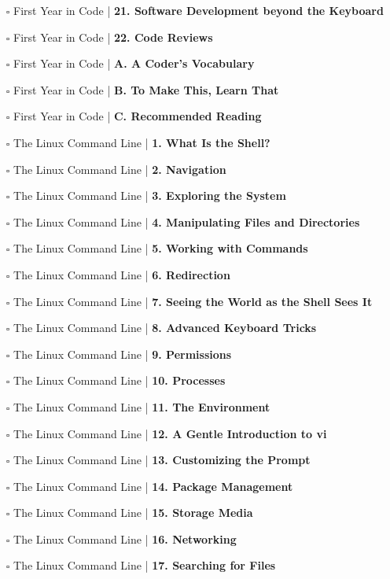 \documentclass[a4, landscape, 12pt]{article}
\newcommand{\checkbox}{$\square$}%
\begin{document}
\begin{itemize}
{}
\item [\checkbox]  First Year in Code | \textbf{ 21. Software Development beyond the Keyboard
}
\item [\checkbox]  First Year in Code | \textbf{ 22. Code Reviews
}
\item [\checkbox]  First Year in Code | \textbf{ A. A Coder's Vocabulary 
}
\item [\checkbox]  First Year in Code | \textbf{ B. To Make This, Learn That
}
\item [\checkbox]  First Year in Code | \textbf{ C. Recommended Reading
}
\item [\checkbox]  The Linux Command Line | \textbf{ 1. What Is the Shell?
}
\item [\checkbox]  The Linux Command Line | \textbf{ 2. Navigation
}
\item [\checkbox]  The Linux Command Line | \textbf{ 3. Exploring the System
}
\item [\checkbox]  The Linux Command Line | \textbf{ 4. Manipulating Files and Directories
}
\item [\checkbox]  The Linux Command Line | \textbf{ 5. Working with Commands
}
\item [\checkbox]  The Linux Command Line | \textbf{ 6. Redirection
}
\item [\checkbox]  The Linux Command Line | \textbf{ 7. Seeing the World as the Shell Sees It
}
\item [\checkbox]  The Linux Command Line | \textbf{ 8. Advanced Keyboard Tricks
}
\item [\checkbox]  The Linux Command Line | \textbf{ 9. Permissions
}
\item [\checkbox]  The Linux Command Line | \textbf{ 10. Processes
}
\item [\checkbox]  The Linux Command Line | \textbf{ 11. The Environment
}
\item [\checkbox]  The Linux Command Line | \textbf{ 12. A Gentle Introduction to vi
}
\item [\checkbox]  The Linux Command Line | \textbf{ 13. Customizing the Prompt
}
\item [\checkbox]  The Linux Command Line | \textbf{ 14. Package Management
}
\item [\checkbox]  The Linux Command Line | \textbf{ 15. Storage Media
}
\item [\checkbox]  The Linux Command Line | \textbf{ 16. Networking
}
\item [\checkbox]  The Linux Command Line | \textbf{ 17. Searching for Files
}
\end{itemize}
\end{document}
